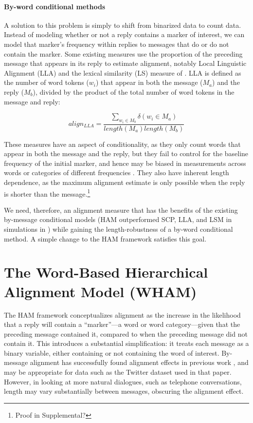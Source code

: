 \documentclass[11pt]{article}
\begin{document}
\paragraph{By-word conditional methods} A solution to this problem is simply to shift from binarized data to count data. Instead of modeling whether or not a reply contains a marker of interest, we can model that marker's frequency within replies to messages that do or do not contain the marker.  Some existing measures use the proportion of the preceding message that appears in its reply to estimate alignment, notably Local Linguistic Alignment (LLA) \cite{FusaroliEtAl2012,WangReitterYen2014} and the lexical similarity (LS) measure of \cite{HealeyPurverHowes2014}. LLA is defined as the number of word tokens ($w_i$) that appear in both the message ($M_a$) and the reply ($M_b$), divided by the product of the total number of word tokens in the message and reply:

\begin{equation}
align_{LLA} = \frac{\sum_{w_i \in M_b} \delta(w_i \in M_a)}{length(M_a)length(M_b)}
\end{equation}

These measures have an aspect of conditionality, as they only count words that appear in both the message and the reply, but they fail to control for the baseline frequency of the initial marker, and hence may be biased in measurements across words or categories of different frequencies \cite{DoyleYurovskyFrank2016}. They also have inherent length dependence, as the maximum alignment estimate is only possible when the reply is shorter than the message.\footnote{Proof in Supplemental?}

We need, therefore, an alignment measure that has the benefits of the existing by-message conditional models (HAM outperformed SCP, LLA, and LSM in simulations in \cite{DoyleYurovskyFrank2016}) while gaining the length-robustness of a by-word conditional method.  A simple change to the HAM framework satisfies this goal.

\section{The Word-Based Hierarchical Alignment Model (WHAM)}

The HAM framework conceptualizes alignment as the increase in the likelihood that a reply will contain a ``marker''---a word or word category---given that the preceding message contained it, compared to when the preceding message did not contain it. This introduces a substantial simplification: it treats each message as a binary variable, either containing or not containing the word of interest. By-message alignment has successfully found alignment effects in previous work \cite{DNMGamonDumais2011}, and may be appropriate for data such as the Twitter dataset used in that paper. However, in looking at more natural dialogues, such as telephone conversations, length may vary substantially between messages, obscuring the alignment effect.
\end{document}
